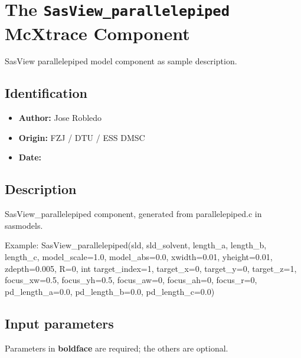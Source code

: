 \section{The \texttt{SasView\_parallelepiped} McXtrace Component}
SasView parallelepiped model component as sample description.

\subsection*{Identification}
\begin{itemize}
  \item \textbf{Author:} Jose Robledo
  \item \textbf{Origin:} FZJ / DTU / ESS DMSC
  \item \textbf{Date:} 
\end{itemize}

\subsection*{Description}
SasView\_parallelepiped component, generated from parallelepiped.c in sasmodels.

Example: SasView\_parallelepiped(sld, sld\_solvent, length\_a, length\_b, length\_c, model\_scale=1.0, model\_abs=0.0, xwidth=0.01, yheight=0.01, zdepth=0.005, R=0, int target\_index=1, target\_x=0, target\_y=0, target\_z=1, focus\_xw=0.5, focus\_yh=0.5, focus\_aw=0, focus\_ah=0, focus\_r=0, pd\_length\_a=0.0, pd\_length\_b=0.0, pd\_length\_c=0.0)

\subsection*{Input parameters}
Parameters in \textbf{boldface} are required; the others are optional.

